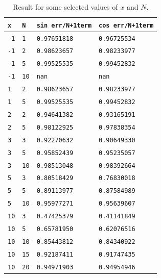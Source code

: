 \documentclass[a4paper,10pt]{article}
\begin{document}
\begin{table}[!ht]
\centering 
  \begin{minipage}[t]{105mm}
    \caption{
      Result for some selected values of $x$ and $N$.
    } 
    \label{TABtask1}
  \end{minipage}

  \vspace{5mm}
  \begin{tabular}{l l l l} 
    \texttt{x}&\texttt{N}&\texttt{sin err/N+1term} & \texttt{cos err/N+1term} \\
    \hline
    \texttt{-1}	& \texttt{1}	& \texttt{0.97651818} & \texttt{0.96725534} 	\\
    \texttt{-1}	& \texttt{2}	& \texttt{0.98623657} & \texttt{0.98233977} 	\\
    \texttt{-1}	& \texttt{5}	& \texttt{0.99525535} & \texttt{0.99452832} 	\\
    \texttt{-1}	& \texttt{10}	& \texttt{nan} & \texttt{nan} 	\\
    \hline 
    \texttt{1}	& \texttt{2}	& \texttt{0.98623657} & \texttt{0.98233977} 	\\
    \texttt{1}	& \texttt{5}	& \texttt{0.99525535} & \texttt{0.99452832} 	\\
    \hline
    \texttt{2}	& \texttt{2} 	& \texttt{0.94641382} & \texttt{0.93165191}	\\
    \texttt{2}	& \texttt{5}	& \texttt{0.98122925} & \texttt{0.97838354}	\\
    \hline
    \texttt{3}	& \texttt{3}	& \texttt{0.92270632} & \texttt{0.90649330}	\\
    \texttt{3}	& \texttt{5}	& \texttt{0.95852439} & \texttt{0.95235057}	\\
    \texttt{3}	& \texttt{10}	& \texttt{0.98513048} & \texttt{0.98392664}	\\
    \hline
    \texttt{5}	& \texttt{3}	& \texttt{0.80518429} & \texttt{0.76830018}	\\
    \texttt{5}	& \texttt{5}	& \texttt{0.89113977} & \texttt{0.87584989}	\\
    \texttt{5}	& \texttt{10}	& \texttt{0.95977271} & \texttt{0.95639607}	\\
    \hline
    \texttt{10}	& \texttt{3}	& \texttt{0.47425379} & \texttt{0.41141849}	\\
    \texttt{10}	& \texttt{5}	& \texttt{0.65781950} & \texttt{0.62076516}	\\
    \texttt{10}	& \texttt{10}	& \texttt{0.85443812} & \texttt{0.84340922}	\\
    \texttt{10}	& \texttt{15}	& \texttt{0.92187411} & \texttt{0.91747435}	\\
    \texttt{10}	& \texttt{20}	& \texttt{0.94971903} & \texttt{0.94954946}	\\
  \end{tabular}
\end{table}
\end{document}
